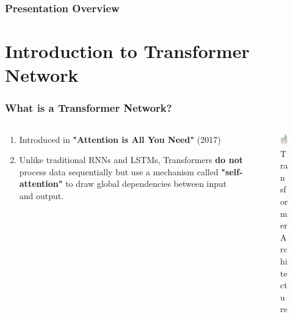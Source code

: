 \documentclass[
	12pt, %
]{beamer}
\begin{document}
\begin{frame}
	\frametitle{Presentation Overview} %
	
	\tableofcontents %
\end{frame}

\section{Introduction to Transformer Network}
\begin{frame}
	\frametitle{What is a Transformer Network?}
	\begin{columns}
		\begin{column}{0.5\textwidth}
			\begin{enumerate}
				\item 
				Introduced in \textbf{"Attention is All You Need"} (2017)
				
				\item 
				Unlike traditional RNNs and LSTMs, Transformers \textbf{do not} process data sequentially but use a mechanism called \textbf{"self-attention"} to draw global dependencies between input and output.
			\end{enumerate}
		\end{column}
		
		\begin{column}{0.5\textwidth}
			\begin{figure}
				\includegraphics[width=5.3cm]{Images/img1.png}
				\caption{Transformer Architecture}
			\end{figure}
		\end{column}
	\end{columns}			
\end{frame}
\end{document}
